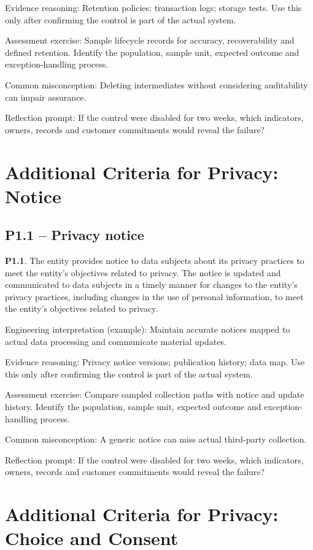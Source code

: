 \documentclass[10pt,oneside]{report}
\begin{document}
Evidence reasoning: Retention policies; transaction logs; storage tests. Use this only after confirming the control is part of the actual system.

Assessment exercise: Sample lifecycle records for accuracy, recoverability and defined retention. Identify the population, sample unit, expected outcome and exception-handling process.

Common misconception: Deleting intermediates without considering auditability can impair assurance.

Reflection prompt: If the control were disabled for two weeks, which indicators, owners, records and customer commitments would reveal the failure?

\section{Additional Criteria for Privacy: Notice}
\subsection{P1.1 -- Privacy notice}
\begin{aicpabox}
\textbf{P1.1}. The entity provides notice to data subjects about its privacy practices to meet the entity's objectives related to privacy. The notice is updated and communicated to data subjects in a timely manner for changes to the entity's privacy practices, including changes in the use of personal information, to meet the entity's objectives related to privacy.\par{}
\end{aicpabox}
Engineering interpretation (example): Maintain accurate notices mapped to actual data processing and communicate material updates.

Evidence reasoning: Privacy notice versions; publication history; data map. Use this only after confirming the control is part of the actual system.

Assessment exercise: Compare sampled collection paths with notice and update history. Identify the population, sample unit, expected outcome and exception-handling process.

Common misconception: A generic notice can miss actual third-party collection.

Reflection prompt: If the control were disabled for two weeks, which indicators, owners, records and customer commitments would reveal the failure?

\section{Additional Criteria for Privacy: Choice and Consent}
\end{document}
